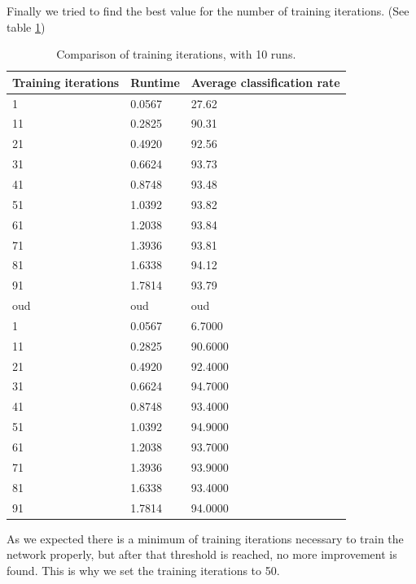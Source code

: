 \documentclass{article}
\begin{document}
Finally we tried to find the best value for the number of training iterations. (See table \ref{tab:trainiter})
\begin{table}[H]
	\centering
	\begin{tabular}{| l | l | l |}
		\hline
		Training iterations & Runtime & Average classification rate \\ \hline

            1 &   0.0567  &  27.62 \\ \hline
           11 &   0.2825  & 90.31 \\ \hline
           21 &   0.4920  & 92.56 \\ \hline

           31 &   0.6624  & 93.73\\ \hline
           41 &   0.8748  & 93.48 \\ \hline
           51 &   1.0392  & 93.82 \\ \hline

           61 &   1.2038  & 93.84 \\ \hline
           71 &   1.3936  & 93.81 \\ \hline
           81 &   1.6338  & 94.12 \\ \hline
           91 &   1.7814  & 93.79 \\ \hline

			oud & oud & oud \\ \hline
            1 &   0.0567  &  6.7000 \\ \hline
           11 &   0.2825  & 90.6000 \\ \hline
           21 &   0.4920  & 92.4000 \\ \hline
           31 &   0.6624  & 94.7000 \\ \hline
           41 &   0.8748  & 93.4000 \\ \hline
           51 &   1.0392  & 94.9000 \\ \hline
           61 &   1.2038  & 93.7000 \\ \hline
           71 &   1.3936  & 93.9000 \\ \hline
           81 &   1.6338  & 93.4000 \\ \hline
           91 &   1.7814  & 94.0000 \\ \hline
	\end{tabular}
	\caption{Comparison of training iterations, with 10 runs.}
	\label{tab:trainiter}
\end{table}

As we expected there is a minimum of training iterations necessary to train the network properly, but after that threshold is reached, no more improvement is found. This is why we set the training iterations to 50.
\end{document}
